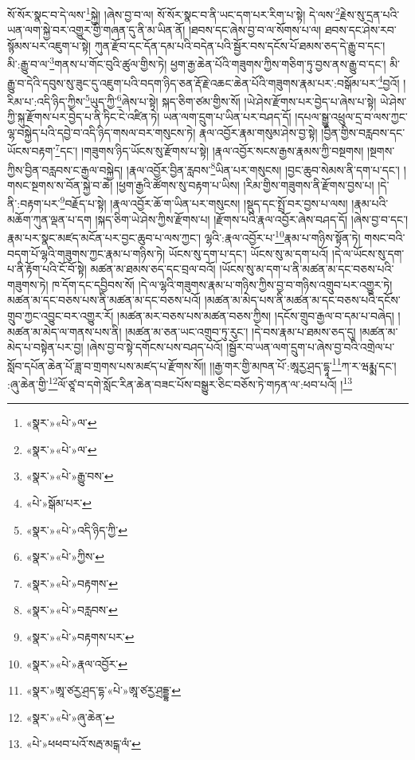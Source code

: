 སོ་སོར་སྣང་བ་དེ་ལས་\footnote{«སྣར་»«པེ་»ལ་}སྐྱེ། །ཞེས་བྱ་བ་ལ། སོ་སོར་སྣང་བ་ནི་ཡང་དག་པར་རིག་པ་སྟེ། དེ་ལས་\footnote{«སྣར་»«པེ་»ལ་}རྗེས་སུ་དྲན་པའི་ཡན་ལག་སྐྱེ་བར་འགྱུར་གྱི་གཞན་དུ་ནི་མ་ཡིན་ནོ། །ཐབས་དང་ཞེས་བྱ་བ་ལ་སོགས་པ་ལ། ཐབས་དང་ཤེས་རབ་སྙོམས་པར་འཇུག་པ་སྟེ། ཀུན་རྫོབ་དང་དོན་དམ་པའི་བདེན་པའི་སྦྱོར་བས་དངོས་པོ་ཐམས་ཅད་དེ་རྒྱུ་བ་དང་། མི་:རྒྱུ་བ་ལ་\footnote{«སྣར་»«པེ་»རྒྱུ་བས་}གནས་པ་གོང་བུའི་ཚུལ་གྱིས་ཏེ། ཕྱག་རྒྱ་ཆེན་པོའི་གཟུགས་ཀྱིས་གཅིག་ཏུ་བྱས་ནས་རྒྱུ་བ་དང་། མི་རྒྱུ་བ་དེའི་དབུས་སུ་ཟུང་དུ་འཇུག་པའི་བདག་ཉིད་ཅན་རྡོ་རྗེ་འཆང་ཆེན་པོའི་གཟུགས་རྣམ་པར་:བསྒོམ་པར་\footnote{«པེ་»སྒོམ་པར་}བྱའོ། །རིམ་པ་:འདི་ཉིད་ཀྱིས་\footnote{«སྣར་»«པེ་»འདི་ཉིད་ཀྱི་}ཡུད་ཀྱི་\footnote{«སྣར་»«པེ་»ཀྱིས་}ཞེས་པ་སྟེ། སྐད་ཅིག་ཙམ་གྱིས་སོ། །ཡེ་ཤེས་རྫོགས་པར་བྱེད་པ་ཞེས་པ་སྟེ། ཡེ་ཤེས་ཀྱི་སྐུ་རྫོགས་པར་བྱེད་པ་ནི་ཏིང་ངེ་འཛིན་ཏེ། ཡན་ལག་དྲུག་པ་ཡིན་པར་བཤད་དོ། །དཔལ་སྒྱུ་འཕྲུལ་དྲ་བ་ལས་ཀྱང་ལྷ་བསྐྱེད་པའི་དབྱེ་བ་འདི་ཉིད་གསལ་བར་གསུངས་ཏེ། རྣལ་འབྱོར་རྣམ་གསུམ་ཤེས་བྱ་སྟེ། །བྱིན་གྱིས་བརླབས་དང་ཡོངས་བརྟག་\footnote{«སྣར་»«པེ་»བརྟགས་}དང་། །གཟུགས་ཉིད་ཡོངས་སུ་རྫོགས་པ་སྟེ། །རྣལ་འབྱོར་སངས་རྒྱས་རྣམས་ཀྱི་བསྔགས། །སྔགས་ཀྱིས་བྱིན་བརླབས་ང་རྒྱལ་བསྐྱེད། །རྣལ་འབྱོར་བྱིན་རླབས་\footnote{«སྣར་»«པེ་»བརླབས་}ཡིན་པར་གསུངས། །བྱང་ཆུབ་སེམས་ནི་དག་པ་དང་། །གསང་སྔགས་ས་བོན་སྐྱེ་བ་ཆེ། །ཕྱག་རྒྱའི་ཚོགས་སུ་བརྟག་པ་ཡིས། །རིམ་གྱིས་གཟུགས་ནི་རྫོགས་བྱས་པ། །དེ་ནི་:བརྟག་པར་\footnote{«སྣར་»«པེ་»བརྟགས་པར་}བརྗོད་པ་སྟེ། །རྣལ་འབྱོར་ཆོ་ག་ཡིན་པར་གསུངས། །སྡུད་དང་སྤྲོ་བར་བྱས་པ་ལས། །རྣམ་པའི་མཆོག་ཀུན་ལྡན་པ་དག །སྐད་ཅིག་ཡེ་ཤེས་ཀྱིས་རྫོགས་པ། །རྫོགས་པའི་རྣལ་འབྱོར་ཞེས་བཤད་དོ། །ཞེས་བྱ་བ་དང་། རྣམ་པར་སྣང་མཛད་མངོན་པར་བྱང་ཆུབ་པ་ལས་ཀྱང་། ལྷའི་:རྣལ་འབྱོར་པ་\footnote{«སྣར་»«པེ་»རྣལ་འབྱོར་}རྣམ་པ་གཉིས་སྟོན་ཏེ། གསང་བའི་བདག་པོ་ལྷའི་གཟུགས་ཀྱང་རྣམ་པ་གཉིས་ཏེ། ཡོངས་སུ་དག་པ་དང་། ཡོངས་སུ་མ་དག་པའོ། །དེ་ལ་ཡོངས་སུ་དག་པ་ནི་རྟོག་པའི་ངོ་བོ་སྟེ། མཚན་མ་ཐམས་ཅད་དང་བྲལ་བའོ། །ཡོངས་སུ་མ་དག་པ་ནི་མཚན་མ་དང་བཅས་པའི་གཟུགས་ཏེ། ཁ་དོག་དང་དབྱིབས་སོ། །དེ་ལ་ལྷའི་གཟུགས་རྣམ་པ་གཉིས་ཀྱིས་བྱ་བ་གཉིས་འགྲུབ་པར་འགྱུར་ཏེ། མཚན་མ་དང་བཅས་པས་ནི་མཚན་མ་དང་བཅས་པའོ། །མཚན་མ་མེད་པས་ནི་མཚན་མ་དང་བཅས་པའི་དངོས་གྲུབ་ཀྱང་འབྱུང་བར་འགྱུར་རོ། །མཚན་མར་བཅས་པས་མཚན་བཅས་ཀྱིས། །དངོས་གྲུབ་རྒྱལ་བ་དམ་པ་བཞེད། །མཚན་མ་མེད་ལ་གནས་པས་ནི། །མཚན་མ་ཅན་ཡང་འགྲུབ་ཏུ་རུང་། །དེ་བས་རྣམ་པ་ཐམས་ཅད་དུ། །མཚན་མ་མེད་པ་བསྟེན་པར་བྱ། །ཞེས་བྱ་བ་སྟེ་དགོངས་པས་བཤད་པའོ། །སྦྱོར་བ་ཡན་ལག་དྲུག་པ་ཞེས་བྱ་བའི་འགྲེལ་པ་སློབ་དཔོན་ཆེན་པོ་ཟླ་བ་གྲགས་པས་མཛད་པ་རྫོགས་སོ།། །།རྒྱ་གར་གྱི་མཁན་པོ་:ཨཱརྱ་ཤྲད་དྷཱ་\footnote{«སྣར་»ཨཱ་ཙརྱ་ཤྲད་དྷ་«པེ་»ཨཱ་ཙརྱ་ཤྲདྡྷ་}ཀ་ར་ཝརྨྨ་དང་། :ཞུ་ཆེན་གྱི་\footnote{«སྣར་»«པེ་»ཞུ་ཆེན་}ལོ་ཙཱ་བ་དགེ་སློང་རིན་ཆེན་བཟང་པོས་བསྒྱུར་ཅིང་བཅོས་ཏེ་གཏན་ལ་:ཕབ་པའོ། །\footnote{«པེ་»ཕཕབ་པའོ་སརྦ་མངྒ་ལཾ་}